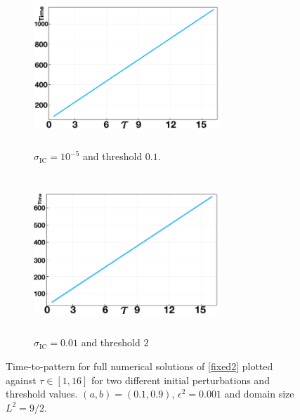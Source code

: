 \begin{figure}[H]
    \centering
    \begin{subfigure}[t]{0.45\textwidth}
        \centering
        \includegraphics[width=7cm,height=6cm]{longlin2.png}
        \caption{$\sigma_{\text{IC}}=10^{-5}$ and threshold $0.1$.}
        \label{fig:linperturb1a}
    \end{subfigure}
    \hfill
    \begin{subfigure}[t]{0.45\textwidth}
        \centering
        \includegraphics[width=7cm,height=6cm]{longlin1.png}
        \caption{$\sigma_{\text{IC}}=0.01$ and threshold $2$}
        \label{fig:linperturb1b}
    \end{subfigure}
    \caption{Time-to-pattern for full numerical solutions of \eqref{fixed2} plotted against $\tau\in[1,16]$ for two different initial perturbations and threshold values. $(a,b)=(0.1,0.9)$, $\epsilon^2=0.001$ and domain size $L^2=9/2$.}
    \label{fig:linperturb1}
\end{figure}


